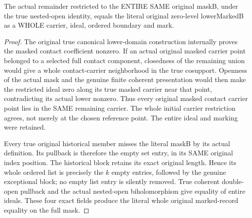 \begin{theorem}
\label{hir:zero-contact-remainder-whole-original-mask}
\leanok
{}
The actual remainder restricted to the ENTIRE SAME original maskB, under the
true nested-open identity, equals the literal original zero-level
lowerMarkedB as a WHOLE carrier, ideal, ordered boundary and mark.
\end{theorem}
\begin{proof}
The original true canonical lower-domain construction internally proves the
masked contact coefficient nonzero. If an actual original masked carrier
point belonged to a selected full contact component, closedness of the
remaining union would give a whole contact-carrier neighborhood in the true
cosupport. Openness of the actual mask and the genuine finite coherent
presentation would then make the restricted ideal zero along its true
masked carrier near that point, contradicting its actual lower nonzero.
Thus every original masked contact carrier point lies in the SAME remaining
carrier. The whole initial carrier restriction agrees, not merely at the
chosen reference point. The entire ideal and marking were retained.

Every true original historical member misses the literal maskB by its actual
definition. Its pullback is therefore the empty set entry, in its SAME
original index position. The historical block retains its exact original
length. Hence its whole ordered list is precisely the $k$ empty entries,
followed by the genuine exceptional block; no empty list entry is silently
removed. True coherent double-open pullback and the actual nested-open
biholomorphism give equality of entire ideals. These four exact fields
produce the literal whole original marked-record equality on the full mask.
\end{proof}

